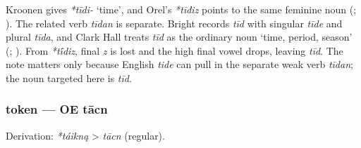 \documentclass[
  british,
  a4paper,
]{article}
\begin{document}
Kroonen gives \emph{*tīdi-} `time', and Orel's \emph{*tīđiz} points to
the same feminine noun (;
). The related verb \emph{tīdan}
is separate. Bright records \emph{tīd} with singular \emph{tīde} and
plural \emph{tīda}, and Clark Hall treats \emph{tīd} as the ordinary
noun `time, period, season'
(;
). From \emph{*tī́diz},
final \emph{z} is lost and the high final vowel drops, leaving
\emph{tīd}. The note matters only because English \emph{tide} can pull
in the separate weak verb \emph{tīdan}; the noun targeted here is
\emph{tīd}.

\subsubsection{token --- OE tācn}\label{token-oe-tux101cn}

Derivation: \emph{*táikną} \textgreater{} \emph{tācn} (regular).

\begingroup
\setlength{\fboxsep}{6pt}
\end{document}
